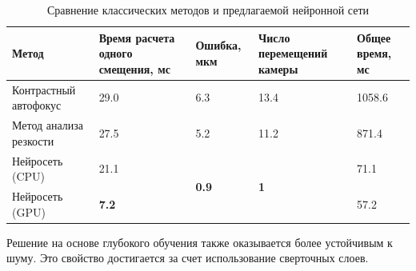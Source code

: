 \begin{table}[!htbp]
	\centering
	\small
	\begin{tabular}{|m{3cm}<{\centering}|m{3cm}<{\centering}|m{3cm}<{\centering}|m{3cm}<{\centering}|m{3cm}<{\centering}|}
		\hline
		Метод& Время расчета одного смещения, мс & Ошибка, мкм & Число перемещений камеры & Общее время, мс \\\hline
		Контрастный автофокус & 29.0 & 6.3 & 13.4 & 1058.6\\\hline
		Метод анализа резкости & 27.5 & 5.2 & 11.2 & 871.4 \\\hline
		Нейросеть (CPU) & 21.1 & \multirow{2}{*}{\textbf{0.9}} & \multirow{2}{*}{\textbf{1}} & 71.1 \\\cline{1-2} \cline{5-5}
		Нейросеть (GPU) & \textbf{7.2} &  &  & 57.2 \\\hline
	\end{tabular}
	\caption{Сравнение классических методов и предлагаемой нейронной сети}
	\label{tab:Comparison_FocuesNet}
\end{table}

Решение на основе глубокого обучения также оказывается более устойчивым к шуму. Это свойство достигается за счет использование сверточных слоев.

%

